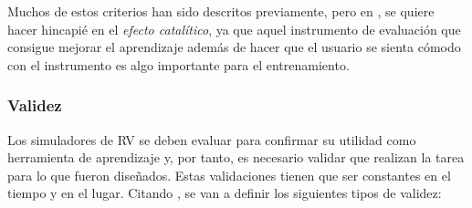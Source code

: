 Muchos de estos criterios han sido descritos previamente, pero en \cite{norcini2011criteria}, se quiere hacer hincapié en el \emph{efecto catalítico}, ya que aquel instrumento de evaluación que consigue mejorar el aprendizaje además de hacer que el usuario se sienta cómodo con el instrumento es algo importante para el entrenamiento.



\subsubsection{Validez}

Los simuladores de \ac{RV} se deben evaluar para confirmar su utilidad como herramienta de aprendizaje y, por tanto, es necesario validar que realizan la tarea para lo que fueron diseñados. Estas validaciones tienen que ser constantes en el tiempo y en el lugar. 
Citando \cite{pales2010uso}, se van a definir los siguientes tipos de validez:
